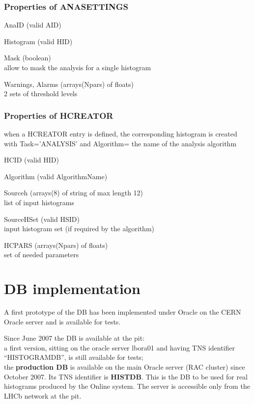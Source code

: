 \documentclass{lhcbnote}
\begin{document}
\subsubsection{Properties of ANASETTINGS}
\begin{description}
\item{AnaID} (valid AID)
\item{Histogram}  (valid HID)
\item{Mask} (boolean)\\
allow to mask the analysis for a single histogram
\item{Warnings, Alarms} (arrays(Npars) of floats)\\
2 sets of threshold levels
\end{description}

\subsubsection{Properties of HCREATOR}
when a HCREATOR entry is defined, the corresponding histogram is
created with Task='ANALYSIS' and Algorithm= the name of the analysis algorithm
\begin{description}
\item{HCID} (valid HID)
\item{Algorithm} (valid AlgorithmName)
\item{Sourceh} (arrays(8) of string of max length 12)\\
list of input histograms
\item{SourceHSet} (valid HSID)\\
input histogram set (if required by the algorithm)
\item{HCPARS} (arrays(Npars) of floats)\\
set of needed parameters 
\end{description}

\section{DB implementation}
A first prototype of the DB has been implemented under Oracle on the
CERN Oracle server and is available for tests.
	
Since June 2007 the DB is available at the pit:\\
a first version, sitting on the oracle server lbora01 and having TNS identifier
``HISTOGRAMDB'',  is still available for tests;\\
the {\bf production DB} is available on the main Oracle server (RAC cluster)
since October 2007. Its TNS identifier is {\bf HISTDB}. This is the DB to be
used for real histograms produced by the Online system. The server is accessible only
from the LHCb network at the pit.
\end{document}
